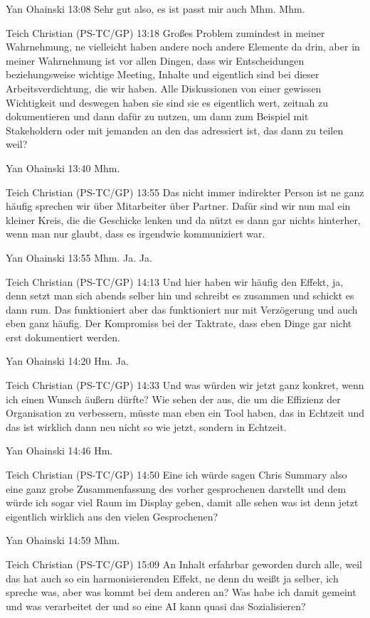 Yan Ohainski   13:08
Sehr gut also, es ist passt mir auch Mhm.
Mhm.

Teich Christian (PS-TC/GP)   13:18
Großes Problem zumindest in meiner Wahrnehmung, ne vielleicht haben andere noch andere Elemente da drin, aber in meiner Wahrnehmung ist vor allen Dingen, dass wir Entscheidungen beziehungsweise wichtige Meeting, Inhalte und eigentlich sind bei dieser Arbeitsverdichtung, die wir haben.
Alle Diskussionen von einer gewissen Wichtigkeit und deswegen haben sie sind sie es eigentlich wert, zeitnah zu dokumentieren und dann dafür zu nutzen, um dann zum Beispiel mit Stakeholdern oder mit jemanden an den das adressiert ist, das dann zu teilen weil?

Yan Ohainski   13:40
Mhm.

Teich Christian (PS-TC/GP)   13:55
Das nicht immer indirekter Person ist ne ganz häufig sprechen wir über Mitarbeiter über Partner. Dafür sind wir nun mal ein kleiner Kreis, die die Geschicke lenken und da nützt es dann gar nichts hinterher, wenn man nur glaubt, dass es irgendwie kommuniziert war.

Yan Ohainski   13:55
Mhm.
Ja.
Ja.

Teich Christian (PS-TC/GP)   14:13
Und hier haben wir häufig den Effekt, ja, denn setzt man sich abends selber hin und schreibt es zusammen und schickt es dann rum. Das funktioniert aber das funktioniert nur mit Verzögerung und auch eben ganz häufig. Der Kompromiss bei der Taktrate, dass eben Dinge gar nicht erst dokumentiert werden.

Yan Ohainski   14:20
Hm.
Ja.

Teich Christian (PS-TC/GP)   14:33
Und was würden wir jetzt ganz konkret, wenn ich einen Wunsch äußern dürfte? Wie sehen der aus, die um die Effizienz der Organisation zu verbessern, müsste man eben ein Tool haben, das in Echtzeit und das ist wirklich dann neu nicht so wie jetzt, sondern in Echtzeit.

Yan Ohainski   14:46
Hm.

Teich Christian (PS-TC/GP)   14:50
Eine ich würde sagen Chris Summary also eine ganz grobe Zusammenfassung des vorher gesprochenen darstellt und dem würde ich sogar viel Raum im Display geben, damit alle sehen was ist denn jetzt eigentlich wirklich aus den vielen Gesprochenen?

Yan Ohainski   14:59
Mhm.

Teich Christian (PS-TC/GP)   15:09
An Inhalt erfahrbar geworden durch alle, weil das hat auch so ein harmonisierenden Effekt, ne denn du weißt ja selber, ich spreche was, aber was kommt bei dem anderen an? Was habe ich damit gemeint und was verarbeitet der und so eine AI kann quasi das Sozialisieren?

